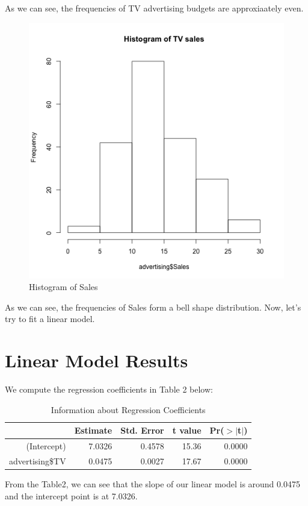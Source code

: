 \documentclass{article}
\begin{document}
\noindent 
As we can see, the frequencies of TV advertising budgets are approxiaately even.\newline

\begin{figure}[H]
\centering
\includegraphics{../images/histogram-sales.png}
\caption{\label{fig:Sales} Histogram of Sales}
\end{figure}

\noindent
As we can see, the frequencies of Sales form a bell shape distribution. Now, let's try to fit a linear model.

\section{Linear Model Results}
We compute the regression coefficients in Table 2 below:

\begin{table}[ht]
\centering
\begin{tabular}{rrrrr}
  \hline
 & Estimate & Std. Error & t value & Pr($>$$|$t$|$) \\ 
  \hline
(Intercept) & 7.0326 & 0.4578 & 15.36 & 0.0000 \\ 
  advertising\$TV & 0.0475 & 0.0027 & 17.67 & 0.0000 \\ 
   \hline
\end{tabular}
\caption{Information about Regression Coefficients} 
\end{table}\noindent
From the Table2, we can see that the slope of our linear model is around 0.0475 and the intercept point is at 7.0326.\newline
\end{document}
